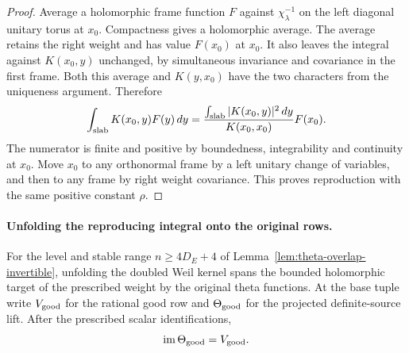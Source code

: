 \begin{proof}
Average a holomorphic frame function \(F\) against
\(\chi_\lambda^{-1}\) on the left diagonal unitary torus
at \(x_0\). Compactness gives a holomorphic average.
The average retains the right weight and has value
\(F(x_0)\) at \(x_0\). It also leaves the integral against
\(K(x_0,y)\) unchanged, by simultaneous invariance
and covariance in the first frame. Both this average
and \(K(y,x_0)\) have the two characters from the
uniqueness argument. Therefore
\[
 \int_{\rm slab}K(x_0,y)F(y)\,dy
 =\frac{\int_{\rm slab}|K(x_0,y)|^2\,dy}{K(x_0,x_0)}
   F(x_0).
\]
The numerator is finite and positive by boundedness,
integrability and continuity at \(x_0\). Move \(x_0\)
to any orthonormal frame by a left unitary change of
variables, and then to any frame by right weight
covariance. This proves reproduction with the same
positive constant \(\rho\).
\end{proof}

\paragraph{Unfolding the reproducing integral onto the original rows.}

\begin{proposition}\label{prop:span-original-theta}
For the level and stable range \(n\ge4D_E+4\) of
Lemma~\ref{lem:theta-overlap-invertible}, unfolding
the doubled Weil kernel spans the bounded holomorphic target of the
prescribed weight by the original theta functions. At the base tuple write \(V_{\rm good}\) for the rational good row and \(\Theta_{\rm good}\) for the projected definite-source lift. After the prescribed scalar identifications,
\[
 \operatorname{im}\Theta_{\rm good}=V_{\rm good}.
\]
\end{proposition}

